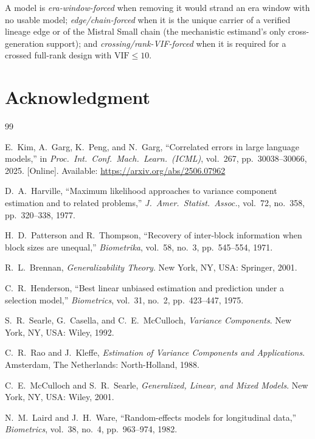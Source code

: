 \documentclass{ieeeaccess}
\theoremstyle{definition}
\theoremstyle{plain}
\begin{document}
A model is \emph{era-window-forced} when removing it would strand an era window
with no usable model; \emph{edge/chain-forced} when it is the unique carrier of
a verified lineage edge or of the Mistral Small chain (the mechanistic
estimand's only cross-generation support); and \emph{crossing/rank-VIF-forced}
when it is required for a crossed full-rank design with $\mathrm{VIF}\le10$.

\section*{Acknowledgment}

\begin{thebibliography}{99}

 E.~Kim, A.~Garg, K.~Peng, and N.~Garg, ``Correlated errors in
large language models,'' in \emph{Proc.\ Int.\ Conf.\ Mach.\ Learn.\ (ICML)},
vol.~267, pp.~30038--30066, 2025. [Online]. Available: \url{https://arxiv.org/abs/2506.07962}

 D.~A.~Harville, ``Maximum likelihood approaches to variance
component estimation and to related problems,'' \emph{J.\ Amer.\ Statist.\ Assoc.},
vol.~72, no.~358, pp.~320--338, 1977.

 H.~D.~Patterson and R.~Thompson, ``Recovery of
inter-block information when block sizes are unequal,'' \emph{Biometrika},
vol.~58, no.~3, pp.~545--554, 1971.

 R.~L.~Brennan, \emph{Generalizability Theory}. New York, NY,
USA: Springer, 2001.

 C.~R.~Henderson, ``Best linear unbiased estimation and
prediction under a selection model,'' \emph{Biometrics}, vol.~31, no.~2,
pp.~423--447, 1975.

 S.~R.~Searle, G.~Casella, and C.~E.~McCulloch,
\emph{Variance Components}. New York, NY, USA: Wiley, 1992.

 C.~R.~Rao and J.~Kleffe, \emph{Estimation of Variance
Components and Applications}. Amsterdam, The Netherlands: North-Holland, 1988.

 C.~E.~McCulloch and S.~R.~Searle, \emph{Generalized,
Linear, and Mixed Models}. New York, NY, USA: Wiley, 2001.

 N.~M.~Laird and J.~H.~Ware, ``Random-effects models for
longitudinal data,'' \emph{Biometrics}, vol.~38, no.~4, pp.~963--974, 1982.


\end{thebibliography}
\end{document}
